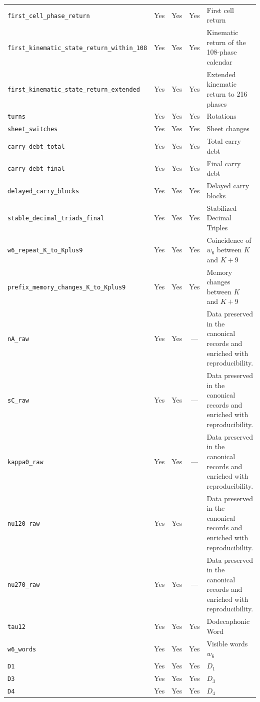 \begin{longtable}{p{}ccc p{}}
\nolinkurl{first_cell_phase_return} & Yes & Yes & Yes & First cell return \\
\nolinkurl{first_kinematic_state_return_within_108} & Yes & Yes & Yes & Kinematic return of the 108-phase calendar \\
\nolinkurl{first_kinematic_state_return_extended} & Yes & Yes & Yes & Extended kinematic return to 216 phases \\
\nolinkurl{turns} & Yes & Yes & Yes & Rotations \\
\nolinkurl{sheet_switches} & Yes & Yes & Yes & Sheet changes \\
\nolinkurl{carry_debt_total} & Yes & Yes & Yes & Total carry debt \\
\nolinkurl{carry_debt_final} & Yes & Yes & Yes & Final carry debt \\
\nolinkurl{delayed_carry_blocks} & Yes & Yes & Yes & Delayed carry blocks \\
\nolinkurl{stable_decimal_triads_final} & Yes & Yes & Yes & Stabilized Decimal Triples \\
\nolinkurl{w6_repeat_K_to_Kplus9} & Yes & Yes & Yes & Coincidence of \(w_6\) between \(K\) and \(K+9\) \\
\nolinkurl{prefix_memory_changes_K_to_Kplus9} & Yes & Yes & Yes & Memory changes between \(K\) and \(K+9\) \\
\nolinkurl{nA_raw} & Yes & Yes & --- & Data preserved in the canonical records and enriched with reproducibility. \\
\nolinkurl{sC_raw} & Yes & Yes & --- & Data preserved in the canonical records and enriched with reproducibility. \\
\nolinkurl{kappa0_raw} & Yes & Yes & --- & Data preserved in the canonical records and enriched with reproducibility. \\
\nolinkurl{nu120_raw} & Yes & Yes & --- & Data preserved in the canonical records and enriched with reproducibility. \\
\nolinkurl{nu270_raw} & Yes & Yes & --- & Data preserved in the canonical records and enriched with reproducibility. \\
\nolinkurl{tau12} & Yes & Yes & Yes & Dodecaphonic Word \\
\nolinkurl{w6_words} & Yes & Yes & Yes & Visible words \(w_6\) \\
\nolinkurl{D1} & Yes & Yes & Yes & \(D_1\) \\
\nolinkurl{D3} & Yes & Yes & Yes & \(D_3\) \\
\nolinkurl{D4} & Yes & Yes & Yes & \(D_4\) \\

\end{longtable}
